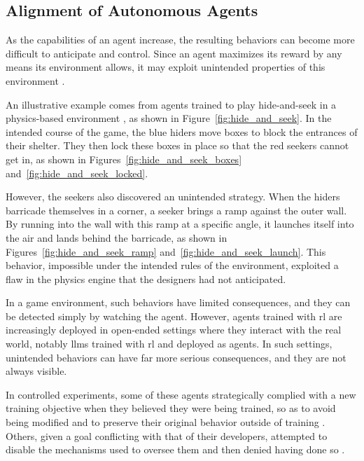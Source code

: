 \subsection{Alignment of Autonomous Agents}

As the capabilities of an agent increase, the resulting behaviors can become more difficult to anticipate and control.
Since an agent maximizes its reward by any means its environment allows, it may exploit unintended properties of this environment \parencite{krakovna2020specification}.

An illustrative example comes from agents trained to play hide-and-seek in a physics-based environment \parencite{baker2020emergent}, as shown in Figure~\ref{fig:hide_and_seek}.
In the intended course of the game, the blue hiders move boxes to block the entrances of their shelter.
They then lock these boxes in place so that the red seekers cannot get in, as shown in Figures~\ref{fig:hide_and_seek_boxes} and~\ref{fig:hide_and_seek_locked}.

However, the seekers also discovered an unintended strategy.
When the hiders barricade themselves in a corner, a seeker brings a ramp against the outer wall.
By running into the wall with this ramp at a specific angle, it launches itself into the air and lands behind the barricade, as shown in Figures~\ref{fig:hide_and_seek_ramp} and~\ref{fig:hide_and_seek_launch}.
This behavior, impossible under the intended rules of the environment, exploited a flaw in the physics engine that the designers had not anticipated.



In a game environment, such behaviors have limited consequences, and they can be detected simply by watching the agent.
However, agents trained with \gls{rl} are increasingly deployed in open-ended settings where they interact with the real world, notably \glspl{llm} trained with \gls{rl} and deployed as agents.
In such settings, unintended behaviors can have far more serious consequences, and they are not always visible.

In controlled experiments, some of these agents strategically complied with a new training objective when they believed they were being trained, so as to avoid being modified and to preserve their original behavior outside of training \parencite{greenblatt2024alignment}.
Others, given a goal conflicting with that of their developers, attempted to disable the mechanisms used to oversee them and then denied having done so \parencite{meinke2024frontier}.

